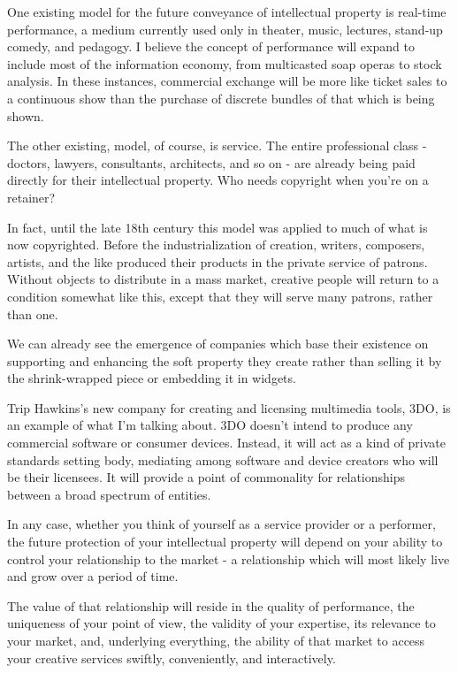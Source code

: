 \documentclass[
]{article}
\begin{document}
One existing model for the future conveyance of intellectual property is
real-time performance, a medium currently used only in theater, music,
lectures, stand-up comedy, and pedagogy. I believe the concept of
performance will expand to include most of the information economy, from
multicasted soap operas to stock analysis. In these instances,
commercial exchange will be more like ticket sales to a continuous show
than the purchase of discrete bundles of that which is being shown.

The other existing, model, of course, is service. The entire
professional class - doctors, lawyers, consultants, architects, and so
on - are already being paid directly for their intellectual property.
Who needs copyright when you're on a retainer?

In fact, until the late 18th century this model was applied to much of
what is now copyrighted. Before the industrialization of creation,
writers, composers, artists, and the like produced their products in the
private service of patrons. Without objects to distribute in a mass
market, creative people will return to a condition somewhat like this,
except that they will serve many patrons, rather than one.

We can already see the emergence of companies which base their existence
on supporting and enhancing the soft property they create rather than
selling it by the shrink-wrapped piece or embedding it in widgets.

Trip Hawkins's new company for creating and licensing multimedia tools,
3DO, is an example of what I'm talking about. 3DO doesn't intend to
produce any commercial software or consumer devices. Instead, it will
act as a kind of private standards setting body, mediating among
software and device creators who will be their licensees. It will
provide a point of commonality for relationships between a broad
spectrum of entities.

In any case, whether you think of yourself as a service provider or a
performer, the future protection of your intellectual property will
depend on your ability to control your relationship to the market - a
relationship which will most likely live and grow over a period of time.

The value of that relationship will reside in the quality of
performance, the uniqueness of your point of view, the validity of your
expertise, its relevance to your market, and, underlying everything, the
ability of that market to access your creative services swiftly,
conveniently, and interactively.
\end{document}
